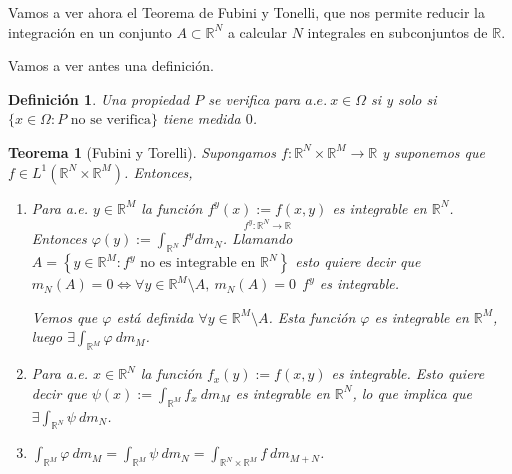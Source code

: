 \documentclass[11pt, a4paper]{article}
\newif\IfInSansMode
\newcommand{\R}{\mathbb{R}} \newcommand{\N}{\mathbb{N}}
\theoremstyle{theorem-style}
\newtheorem{nth}{Teorema}[section]
\theoremstyle{definition-style}
\newtheorem{ndef}{Definición}[section]
\theoremstyle{remark-style}
\theoremstyle{example-style}
\begin{document}
Vamos a ver ahora el Teorema de Fubini y Tonelli, que nos permite reducir la integración en un
conjunto $A \subset \R^N$ a calcular $N$ integrales en
subconjuntos de $\R$.

Vamos a ver antes una definición.

\begin{ndef}
  Una propiedad $P$ se verifica para $a.e.\ x \in \Omega$ si y solo si $\{ x \in
  \Omega : P \text{ no se verifica} \}$ tiene medida $0$.
\end{ndef}


\begin{nth}[Fubini y Torelli]
Supongamos $f: \R^N \times \R^M \rightarrow \R$ y suponemos que $f \in L^1(\R^N
\times \R^M)$. Entonces,

\begin{enumerate}
    \item Para a.e. $y \in \R^M$ la función $\underset{  f^y: \R^N \to \R }{f^y(x) := f(x,y)}$ es integrable en $\R^N$. Entonces $\displaystyle \varphi(y) := \int_{\R^N}f^y dm_N$. Llamando $A = \left\{ y \in \R^M : f^y \text{ no es integrable en } \R^N \right\}$ esto quiere decir que $m_N(A) = 0 \Leftrightarrow \forall y \in \R^M \setminus A, \ m_N(A) =0 \ \ f^y$ es integrable.

  Vemos que $\varphi$ está definida $\forall y \in \R^M \setminus A$. Esta función
  $\varphi$ es integrable en $\R^M$, luego $\exists \int_{\R^M} \varphi \ dm_M$.
\item Para a.e. $x \in \R^N$ la función $f_x(y) := f(x,y)$ es integrable. Esto
  quiere decir que $\psi (x) := \displaystyle \int_{\R^M} f_x \ dm_M$ es
  integrable en $\R^N$, lo que implica que $\exists \displaystyle \int_{\R^N}\psi
  \ dm_N$.
\item $\displaystyle\int_{\R^M} \varphi \ dm_M = \displaystyle\int_{\R^M} \psi \ dm_N = \displaystyle\int_{\R^N \times \R^M} f
  \ dm_{M + N}$.
\end{enumerate}
\end{nth}
\end{document}
